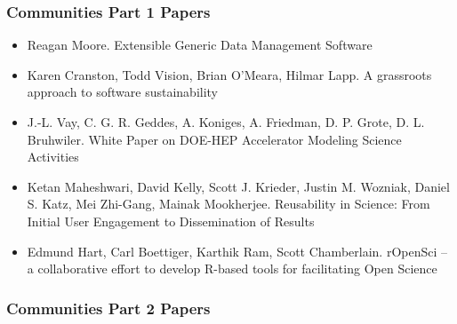 \documentclass[11pt, oneside]{amsart}
\begin{document}
\subsubsection*{Communities Part 1 Papers}

\begin{itemize}

\item Reagan Moore. Extensible Generic Data Management Software~\cite{Moore_WSSSPE}

\item Karen Cranston, Todd Vision, Brian O'Meara, Hilmar Lapp. A
  grassroots approach to software sustainability~\cite{Cranston_WSSSPE}

\item J.-L. Vay, C. G. R. Geddes, A. Koniges, A. Friedman,
  D. P. Grote, D. L. Bruhwiler. White Paper on DOE-HEP Accelerator
  Modeling Science Activities~\cite{Vay_WSSSPE}

\item Ketan Maheshwari, David Kelly, Scott J. Krieder, Justin M. Wozniak, Daniel S. Katz, Mei Zhi-Gang, Mainak Mookherjee. Reusability in Science: From Initial User Engagement to Dissemination of Results~\cite{Maheshwari_WSSSPE}

\item Edmund Hart, Carl Boettiger, Karthik Ram, Scott Chamberlain. rOpenSci -- a collaborative effort to develop R-based tools for facilitating Open Science~\cite{Hart_WSSSPE}

\end{itemize}

\subsubsection*{Communities Part 2 Papers}
\end{document}
